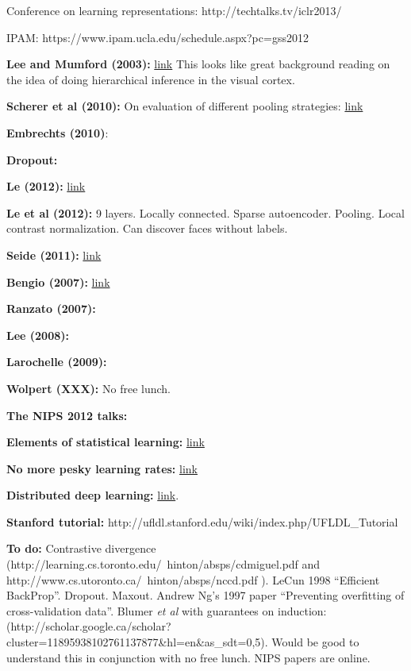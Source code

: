 \documentclass[12pt]{report}
\newcommand{\link}[2]{\href{#1}{#2}}
\begin{document}
Conference on learning representations: http://techtalks.tv/iclr2013/

IPAM: https://www.ipam.ucla.edu/schedule.aspx?pc=gss2012

\textbf{Lee and Mumford (2003):}
\link{http://dash.harvard.edu/bitstream/handle/1/3637109/Mumford\_HierarchBayesInfer.pdf?sequence=1}{link}
This looks like great background reading on the idea of doing
hierarchical inference in the visual cortex.

\textbf{Scherer et al (2010):} On evaluation of different pooling strategies: \link{http://www.ais.uni-bonn.de/papers/icann2010\_maxpool.pdf}{link}



\textbf{Embrechts (2010)}:

\textbf{Dropout:}

\textbf{Le (2012):} \link{https://plus.google.com/u/0/+ResearchatGoogle/posts/EMyhnBetd2F}{link}

\textbf{Le et al (2012):} 9 layers.  Locally connected.  Sparse
autoencoder.  Pooling.  Local contrast normalization.  Can discover
faces without labels.

\textbf{Seide (2011):}
\link{http://research.microsoft.com/apps/pubs/default.aspx?id=153169}{link}

\textbf{Bengio (2007):} \link{http://arxiv.org/pdf/1206.5533v2.pdf}{link}

\textbf{Ranzato (2007):}

\textbf{Lee (2008):} 

\textbf{Larochelle (2009):}

\textbf{Wolpert (XXX):} No free lunch.

\textbf{The NIPS 2012 talks:}

\textbf{Elements of statistical learning:} \link{http://www.stanford.edu/\~hastie/local.ftp/Springer/OLD//ESLII\_print4.pdf}{link}

\textbf{No more pesky learning rates:} \link{http://arxiv.org/pdf/1206.1106.pdf}{link}

\textbf{Distributed deep learning:}
\link{http://research.google.com/archive/large\_deep\_networks_nips2012.html}{link}.

\textbf{Stanford tutorial:} http://ufldl.stanford.edu/wiki/index.php/UFLDL\_Tutorial

\textbf{To do:} Contrastive divergence
(http://learning.cs.toronto.edu/~hinton/absps/cdmiguel.pdf and
http://www.cs.utoronto.ca/~hinton/absps/nccd.pdf ). LeCun 1998
``Efficient BackProp''.  Dropout.  Maxout.  Andrew Ng's 1997 paper
``Preventing overfitting of cross-validation data''.  Blumer \emph{et
  al} with guarantees on induction:
(http://scholar.google.ca/scholar?cluster=11895938102761137877\&hl=en\&as\_sdt=0,5).
Would be good to understand this in conjunction with no free lunch.
NIPS papers are online.  
\end{document}
